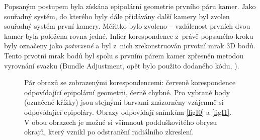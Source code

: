 \documentclass[11pt,oneside,a4paper,pdftex]{article}   %
\begin{document}
		Popsaným postupem byla získána epipolární geometrie prvního páru kamer. Jako sou\-řad\-ný systém,
		do kterého byly dále přidávány další kamery byl zvolen souřadný systém první kamery.  Měřitko
		bylo zvoleno -- vzdálenost prvních dvou kamer byla položena rovna jedné.  Inlier korespondence
		z~právě popsaného kroku byly označeny jako \emph{potvrzené} a byl z~nich zrekonstruován prvotní
		mrak 3D bodů. Tento prvotní mrak bodů byl spolu s prvním párem kamer zpřesněn metodou vyrovnání
		svazku (Bundle Adjustment, opět bylo použito dodaného kódu, \cite{code_repo}).

			\begin{figure}[htb]
					\centering
				\caption{Pár obrazů se zobrazenými korespondencemi: červeně korespondence odpovídající
					epipolární geometrii, černě chybné. Pro vybrané body (označené křížky) jsou
					stejnými barvami znázorněny vzájemně si odpovídající epipoláry. Obrazy
					odpovídají snímkům \ref{figI0} a \ref{figI1}. V obou obrazech je možné
					si všimnout podduškovitého obrysu okrajů, který vznikl po odstranění
					radiálního zkreslení.}
				\label{figKorespondenceAEpipolary}
			\end{figure}
	
\end{document}
